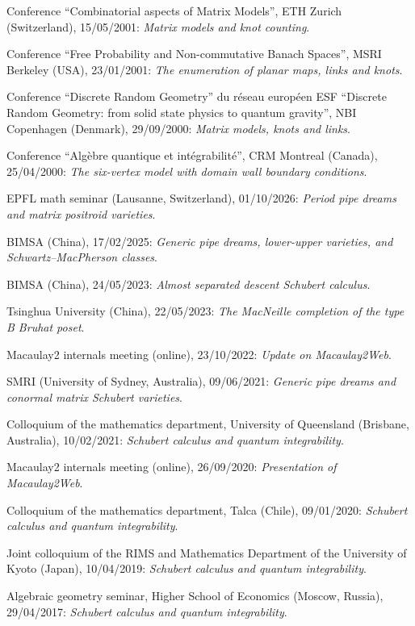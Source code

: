 \s Conference ``Combinatorial aspects of Matrix Models'', 
ETH Zurich (Switzerland), 15/05/2001: {\sl Matrix models and knot counting}.

\s Conference ``Free Probability and Non-commutative Banach Spaces'', MSRI
Berkeley (USA), 23/01/2001: {\sl The enumeration of
planar maps, links and knots}.

\s Conference ``Discrete Random Geometry'' du r\'eseau europ\'een ESF
``Discrete Random Geometry: from solid state physics to quantum gravity'',
NBI Copenhagen (Denmark), 29/09/2000: {\sl Matrix models, knots and links}.

\s Conference ``Alg\`ebre quantique et int\'egrabilit\'e'',
CRM Montreal (Canada), 25/04/2000: {\sl The six-vertex model
with domain wall boundary conditions}.

\endsec


\s EPFL math seminar (Lausanne, Switzerland), 01/10/2026: {\sl Period pipe dreams and matrix positroid varieties}.

\s BIMSA (China), 17/02/2025: {\sl Generic pipe dreams, lower-upper varieties, and Schwartz--MacPherson classes}.

\s BIMSA (China), 24/05/2023: {\sl Almost separated descent Schubert calculus}.

\s Tsinghua University (China), 22/05/2023: {\sl The MacNeille completion of the type B Bruhat poset}.

\s Macaulay2 internals meeting (online), 23/10/2022: {\sl Update on Macaulay2Web}.

\s SMRI (University of Sydney, Australia), 09/06/2021: {\sl Generic pipe dreams and conormal matrix Schubert varieties}.

\s Colloquium of the mathematics department, University of Queensland (Brisbane, Australia), 10/02/2021: {\sl Schubert calculus and quantum integrability}.

\s Macaulay2 internals meeting (online), 26/09/2020: {\sl Presentation of Macaulay2Web}.

\s Colloquium of the mathematics department, Talca (Chile), 09/01/2020: {\sl Schubert calculus and quantum integrability}.

\s Joint colloquium of the RIMS and Mathematics Department of the University of Kyoto (Japan), 10/04/2019: {\sl Schubert calculus and quantum integrability}.

\s Algebraic geometry seminar, Higher School of Economics (Moscow, Russia), 29/04/2017: {\sl Schubert calculus and quantum integrability}.

